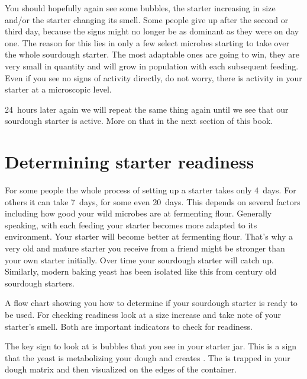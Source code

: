 You should hopefully again see some bubbles, the starter increasing
in size and/or the starter changing its smell. Some people give
up after the second or third day, because the signs might no longer
be as dominant as they were on day one. The reason for this lies in only a few
select microbes starting to take over the whole sourdough starter. The most
adaptable ones are going to win, they are very small in quantity and will
grow in population with each subsequent feeding. Even if you see no signs
of activity directly, do not worry, there is activity in
your starter at a microscopic level.

24~hours later again we will repeat the same thing again until
we see that our sourdough starter is active. More on that in the
next section of this book.

\section{Determining starter readiness}

For some people the whole process of setting up a starter takes
only 4~days. For others it can take 7~days, for some even 20~days.
This depends on several factors including how good your wild microbes
are at fermenting flour. Generally speaking, with each feeding
your starter becomes more adapted to its environment. Your
starter will become better at fermenting flour. That's why
a very old and mature starter you receive from a friend might
be stronger than your own starter initially. Over time
your sourdough starter will catch up. Similarly, modern baking
yeast has been isolated like this from century old sourdough
starters.

\begin{flowchart}[!htb]
\centering
  
  \caption[Determining sourdough starter readiness]{A flow chart showing you how to
      determine if your sourdough starter is ready to be used.  For checking
      readiness look at a size increase and take note of your starter's smell.
      Both are important indicators to check for readiness.}%
  \label{fig:sourdough-starter-readiness}
\end{flowchart}

The key sign to look at is bubbles that you see in your starter
jar. This is a sign that the yeast is metabolizing your
dough and creates . The  is trapped in your dough
matrix and then visualized on the edges of the container.

